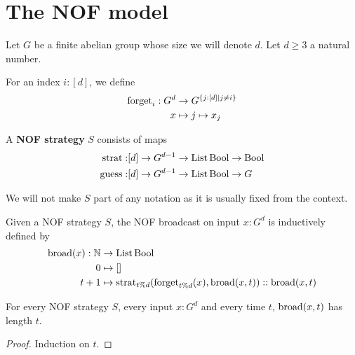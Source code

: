 \chapter{The NOF model}

Let $G$ be a finite abelian group whose size we will denote $d$. Let $d \ge 3$ a natural number.

\begin{definition}
  \label{def:forget}
  \leanok

  For an index $i : [d]$, we define
  \begin{align}
    \operatorname{forget}_i : G^d & \to G^{\{j : [d] \mid j \ne i\}} \\
    x & \mapsto j \mapsto x_j
  \end{align}
\end{definition}

\begin{definition}
  \label{def:strategy}
  \leanok

  A {\bf NOF strategy} $S$ consists of maps
  \begin{align}
    \operatorname{strat} : & [d] \to G^{d - 1} \to \operatorname{List} \operatorname{Bool} \to \operatorname{Bool} \\
    \operatorname{guess} : & [d] \to G^{d - 1} \to \operatorname{List} \operatorname{Bool} \to G
  \end{align}
\end{definition}

We will not make $S$ part of any notation as it is usually fixed from the context.

\begin{definition}
  \label{def:broadcast}
  \leanok

  Given a NOF strategy $S$, the NOF broadcast on input $x : G^d$ is inductively defined by
  \begin{align}
    \operatorname{broad}(x) : \mathbb{N} & \to \operatorname{List} \operatorname{Bool} \\
    0 & \mapsto [] \\
    t + 1 & \mapsto \operatorname{strat}_{t \% d}(\operatorname{forget}_{t \% d}(x), \operatorname{broad}(x, t)) :: \operatorname{broad}(x, t)
  \end{align}
\end{definition}

\begin{lemma}
  \label{lem:length-broadcast}
  \leanok

  For every NOF strategy $S$, every input $x : G^d$ and every time $t$, $\operatorname{broad}(x, t)$ has length $t$.
\end{lemma}
\begin{proof}

  Induction on $t$.
\end{proof}


